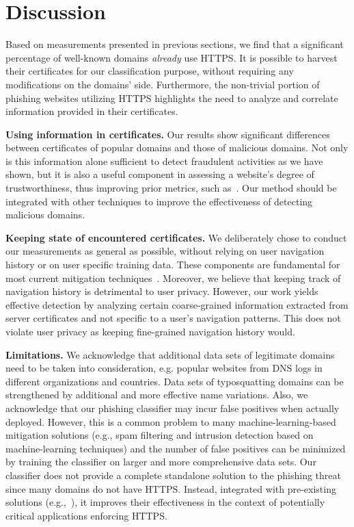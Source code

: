 \documentclass[twocolumn]{article}
\newcommand{\descr}[1]{\bigskip \noindent \textbf{#1}}
\begin{document}
\section{Discussion}\label{sec:discussion}
Based on measurements presented in previous sections, 
we find that a significant percentage of well-known domains
\textit{already} use HTTPS. It is possible to harvest their certificates
for our classification purpose, without requiring any modifications on the domains' side.
Furthermore, the non-trivial portion of phishing websites utilizing HTTPS highlights the need to analyze 
and correlate information provided in their certificates.

\descr{Using information in certificates.}
Our results show significant differences between certificates
of popular domains and those of malicious domains. Not only is this information alone 
sufficient to detect fraudulent activities as we have shown, but it is also a useful 
component in assessing a website's degree of trustworthiness, thus improving prior metrics, such
as~\cite{wu2006,protectphish,learnphishemails}. Our method should be integrated with other techniques 
to improve the effectiveness of detecting malicious domains. 


\descr{Keeping state of encountered certificates.}
We deliberately chose to conduct our measurements as general as possible, without relying on user
navigation history or on user specific training data. These components are fundamental
for most current mitigation techniques~\cite{learnphishemails,phoolproof}.
Moreover, we believe that  keeping track of navigation history is detrimental to user
privacy. However, our work yields effective detection by analyzing certain coarse-grained information extracted
from server certificates and not specific to a user's navigation patterns.
This does not violate user privacy as keeping fine-grained navigation history would. 


\descr{Limitations.} 
We acknowledge that additional data sets of legitimate domains need to be
taken into consideration, e.g. popular websites from DNS logs in different organizations and countries.
Data sets of typosquatting domains can be strengthened by additional and more
effective name variations. Also, we acknowledge that our phishing classifier may incur false positives when actually 
deployed. However, this is a common problem to many machine-learning-based mitigation solutions 
(e.g., spam filtering and intrusion detection based on machine-learning techniques) and the number of false 
positives can be minimized by training the classifier on larger and more comprehensive data 
sets. Our classifier does not provide a complete 
standalone solution to the phishing threat since many domains do not have HTTPS.
Instead, integrated with pre-existing solutions (e.g.,~\cite{wu2006,protectphish,learnphishemails}),
it improves their effectiveness in the context of 
potentially critical applications enforcing HTTPS. \\
\end{document}
